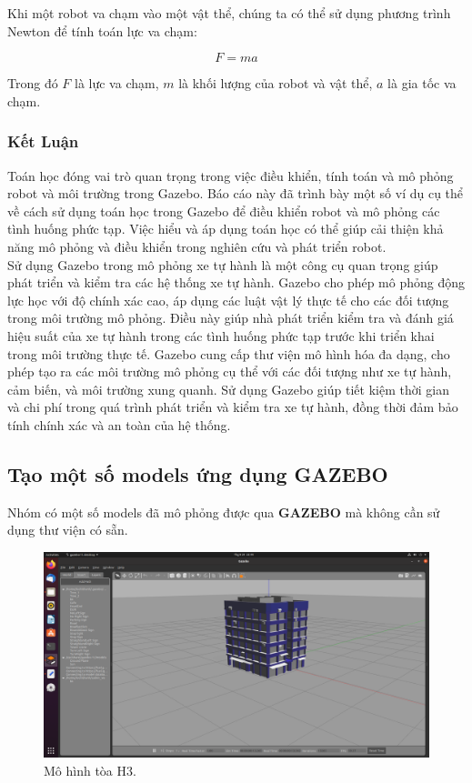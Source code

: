 Khi một robot va chạm vào một vật thể, chúng ta có thể sử dụng phương trình Newton để tính toán lực va chạm:

\begin{equation}
    F = ma
\end{equation}

Trong đó $F$ là lực va chạm, $m$ là khối lượng của robot và vật thể, $a$ là gia tốc va chạm.

\subsubsection{Kết Luận }

Toán học đóng vai trò quan trọng trong việc điều khiển, tính toán và mô phỏng robot và môi trường trong Gazebo. Báo cáo này đã trình bày một số ví dụ cụ thể về cách sử dụng toán học trong Gazebo để điều khiển robot và mô phỏng các tình huống phức tạp. Việc hiểu và áp dụng toán học có thể giúp cải thiện khả năng mô phỏng và điều khiển trong nghiên cứu và phát triển robot.\\
\noindent Sử dụng Gazebo trong mô phỏng xe tự hành là một công cụ quan trọng giúp phát triển và kiểm tra các hệ thống xe tự hành. Gazebo cho phép mô phỏng động lực học với độ chính xác cao, áp dụng các luật vật lý thực tế cho các đối tượng trong môi trường mô phỏng. Điều này giúp nhà phát triển kiểm tra và đánh giá hiệu suất của xe tự hành trong các tình huống phức tạp trước khi triển khai trong môi trường thực tế. Gazebo cung cấp thư viện mô hình hóa đa dạng, cho phép tạo ra các môi trường mô phỏng cụ thể với các đối tượng như xe tự hành, cảm biến, và môi trường xung quanh. Sử dụng Gazebo giúp tiết kiệm thời gian và chi phí trong quá trình phát triển và kiểm tra xe tự hành, đồng thời đảm bảo tính chính xác và an toàn của hệ thống.
\subsection{Tạo một số models ứng dụng GAZEBO}
Nhóm có một số models đã mô phỏng được qua \textbf{GAZEBO} mà không cần sử dụng thư viện có sẵn.\\

\begin{figure}[ht]
  \centering
  \includegraphics[width=\textwidth]{images/H1.png}
  \caption{Mô hình tòa H3.}

\end{figure}


